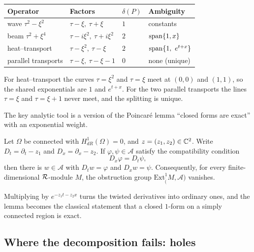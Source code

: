 \begin{example}
\begin{center}\small
\begin{tabular}{@{}L{3.0cm}L{4.4cm}L{1.0cm}L{4.4cm}@{}}
\toprule
Operator & Factors & $\delta(P)$ & Ambiguity\\\midrule
wave $\tau^2-\xi^2$ & $\tau-\xi,\ \tau+\xi$ & $1$ & constants\\
beam $\tau^2+\xi^4$ & $\tau-i\xi^2,\ \tau+i\xi^2$ & $2$ & $\operatorname{span}\{1,x\}$\\
heat--transport & $\tau-\xi^2,\ \tau-\xi$ & $2$ & $\operatorname{span}\{1,\ e^{t+x}\}$\\
parallel transports & $\tau-\xi,\ \tau-\xi-1$ & $0$ & none (unique)\\\bottomrule
\end{tabular}
\end{center}
For heat--transport the curves $\tau=\xi^2$ and $\tau=\xi$ meet at $(0,0)$ and $(1,1)$, so the shared exponentials are $1$ and $e^{t+x}$. For the two parallel transports the lines $\tau=\xi$ and $\tau=\xi+1$ never meet, and the splitting is unique.
\end{example}

The key analytic tool is a version of the Poincar\'e lemma ``closed forms are exact'' with an exponential weight.

\begin{lemma}\label{lem:twisted}
Let $\Omega$ be connected with $H^1_{dR}(\Omega)=0$, and $z=(z_1,z_2)\in\mathbb{C}^2$. Write $D_t=\partial_t-z_1$ and $D_x=\partial_x-z_2$. If $\varphi,\psi\in\mathcal A$ satisfy the compatibility condition
\[
D_x\varphi=D_t\psi,
\]
then there is $w\in\mathcal A$ with $D_tw=\varphi$ and $D_xw=\psi$. Consequently, for every finite-dimensional $\mathcal{R}$-module $M$, the obstruction group $\mathrm{Ext}^1_\ring(M,\mathcal A)$ vanishes.

\end{lemma}

Multiplying by $e^{-z_1t-z_2x}$ turns the twisted derivatives into ordinary ones, and the lemma becomes the classical statement that a closed $1$-form on a simply connected region is exact.

\subsection{Where the decomposition fails: holes}

